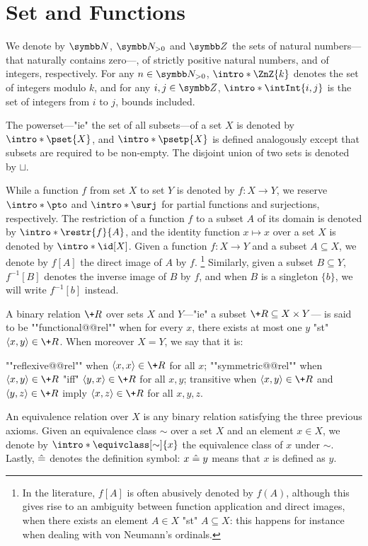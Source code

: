 \section{Set and Functions}

We denote by $\N$, $\Np$ and $\Z$ the sets of natural numbers---that naturally contains zero---,
of strictly positive natural numbers, and of integers, respectively.
For any $n\in\Np$, \AP$\intro*\ZnZ{k}$ denotes the set of integers modulo $k$,
and for any $i,j \in \Z$, $\intro*\intInt{i,j}$ is the set of integers from $i$ to $j$,
bounds included.

The powerset---"ie" the set of all subsets---of a set $X$
is denoted by $\intro*\pset{X}$, and $\intro*\psetp{X}$ is defined analogously
except that subsets are required to be non-empty.
The disjoint union of two sets is denoted by $\sqcup$.

While a function $f$ from set $X$ to set $Y$ is denoted by $f\colon X \to Y$,
we reserve $\intro*\pto$ and $\intro*\surj$ for partial functions and surjections, respectively.
The restriction of a function $f$ to a subset $A$ of its domain is denoted by
$\intro*\restr{f}{A}$, and the identity function $x \mapsto x$ over a set $X$
is denoted by $\intro*\id[X]$.
Given a function $f\colon X \to Y$ and a subset $A \subseteq X$,
we denote by $f[A]$ the direct image of $A$ by $f$.%
\footnote{In the literature, $f[A]$ is often abusively denoted by $f(A)$, although
this gives rise to an ambiguity between function application and direct images,
when there exists an element $A \in X$ "st" $A \subseteq X$: this happens for instance
when dealing with von Neumann's ordinals.}
Similarly, given a subset $B \subseteq Y$, $f^{-1}[B]$ denotes
the inverse image of $B$ by $f$, and when $B$ is a singleton $\{b\}$,
we will write $f^{-1}[b]$ instead.%

A binary relation $\+R$ over sets $X$ and $Y$---"ie" a subset $\+R \subseteq X \times Y$---
is said to be \AP""functional@@rel"" when for every $x$, there exists at most one $y$
"st" $\tup{x,y} \in \+R$.
When moreover $X = Y$, we say that it is:
\begin{itemize}
	\itemAP ""reflexive@@rel"" when $\tup{x,x} \in \+R$ for all $x$;
	\itemAP ""symmetric@@rel"" when $\tup{x,y} \in \+R$ "iff" $\tup{y,x} \in \+R$
		for all $x,y$;
	\itemAP transitive when $\tup{x,y} \in \+R$ and $\tup{y,z} \in \+R$
		imply $\tup{x,z} \in \+R$
		for all $x,y,z$.
\end{itemize}
An equivalence relation over $X$ is any binary relation satisfying the three previous axioms.
Given an equivalence class $\sim$ over a set $X$ and an element $x \in X$,
we denote by $\intro*\equivclass[\sim]{x}$ the equivalence class of $x$ under $\sim$.
Lastly, $\mathrel{\hat{=}}$ denotes the definition symbol: $x \mathrel{\hat{=}} y$ means that $x$ is defined as $y$.

